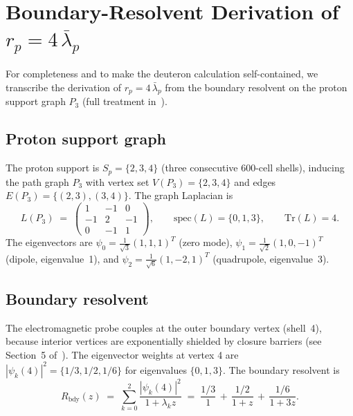 \documentclass[12pt]{article}
\newcommand{\lbar}{\bar{\lambda}}
\begin{document}
\appendix
\section{Boundary-Resolvent Derivation of $r_p = 4\,\lbar_p$}\label{app:proton}

For completeness and to make the deuteron calculation self-contained,
we transcribe the derivation of $r_p = 4\,\lbar_p$ from the boundary
resolvent on the proton support graph $P_3$ (full treatment
in~\citep{SmartRadius}).

\subsection*{Proton support graph}

The proton support is $S_p = \{2, 3, 4\}$ (three consecutive 600-cell
shells), inducing the path graph $P_3$ with vertex set $V(P_3) =
\{2, 3, 4\}$ and edges $E(P_3) = \{(2,3), (3,4)\}$. The graph
Laplacian is
\begin{equation}\label{eq:L_P3}
    L(P_3) \;=\; \begin{pmatrix} 1 & -1 & 0 \\ -1 & 2 & -1 \\ 0 & -1 & 1 \end{pmatrix},
    \qquad \mathrm{spec}(L) = \{0, 1, 3\}, \qquad \mathrm{Tr}(L) = 4.
\end{equation}
The eigenvectors are $\psi_0 = \tfrac{1}{\sqrt 3}(1,1,1)^T$ (zero
mode), $\psi_1 = \tfrac{1}{\sqrt 2}(1, 0, -1)^T$ (dipole,
eigenvalue~1), and $\psi_2 = \tfrac{1}{\sqrt 6}(1, -2, 1)^T$
(quadrupole, eigenvalue~3).

\subsection*{Boundary resolvent}

The electromagnetic probe couples at the outer boundary vertex
(shell~4), because interior vertices are exponentially shielded by
closure barriers (see Section~5 of~\citep{SmartRadius}). The
eigenvector weights at vertex 4 are $|\psi_k(4)|^2 = \{1/3, 1/2,
1/6\}$ for eigenvalues $\{0, 1, 3\}$. The boundary resolvent is
\begin{equation}\label{eq:R_bdy}
    R_{\mathrm{bdy}}(z) \;=\; \sum_{k=0}^{2} \frac{|\psi_k(4)|^2}{1 + \lambda_k z}
    \;=\; \frac{1/3}{1} \,+\, \frac{1/2}{1+z} \,+\, \frac{1/6}{1+3z}.
\end{equation}
\end{document}
